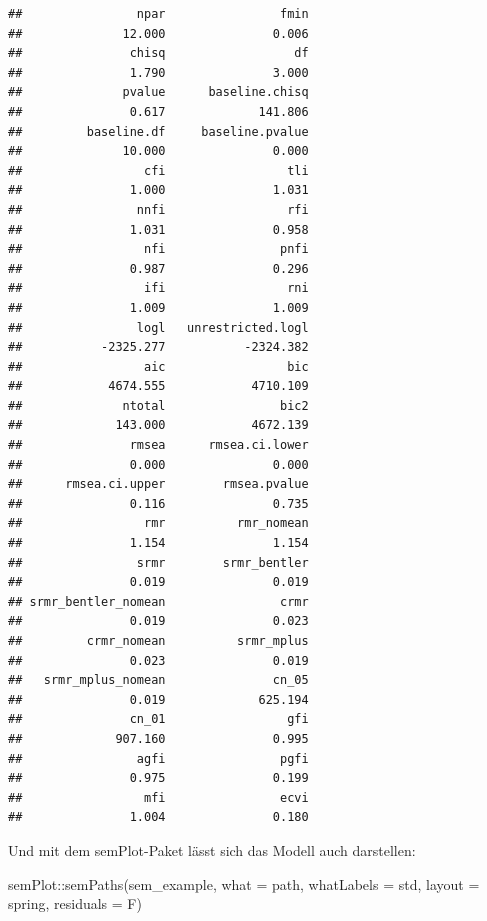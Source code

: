 \documentclass[
]{book}
\newenvironment{Shaded}{\begin{snugshade}}{\end{snugshade}}
\newcommand{\AttributeTok}[1]{\textcolor[rgb]{0.77,0.63,0.00}{#1}}
\newcommand{\FunctionTok}[1]{\textcolor[rgb]{0.00,0.00,0.00}{#1}}
\newcommand{\NormalTok}[1]{#1}
\newcommand{\SpecialCharTok}[1]{\textcolor[rgb]{0.00,0.00,0.00}{#1}}
\newcommand{\StringTok}[1]{\textcolor[rgb]{0.31,0.60,0.02}{#1}}
\begin{document}
\begin{verbatim}
##                npar                fmin 
##              12.000               0.006 
##               chisq                  df 
##               1.790               3.000 
##              pvalue      baseline.chisq 
##               0.617             141.806 
##         baseline.df     baseline.pvalue 
##              10.000               0.000 
##                 cfi                 tli 
##               1.000               1.031 
##                nnfi                 rfi 
##               1.031               0.958 
##                 nfi                pnfi 
##               0.987               0.296 
##                 ifi                 rni 
##               1.009               1.009 
##                logl   unrestricted.logl 
##           -2325.277           -2324.382 
##                 aic                 bic 
##            4674.555            4710.109 
##              ntotal                bic2 
##             143.000            4672.139 
##               rmsea      rmsea.ci.lower 
##               0.000               0.000 
##      rmsea.ci.upper        rmsea.pvalue 
##               0.116               0.735 
##                 rmr          rmr_nomean 
##               1.154               1.154 
##                srmr        srmr_bentler 
##               0.019               0.019 
## srmr_bentler_nomean                crmr 
##               0.019               0.023 
##         crmr_nomean          srmr_mplus 
##               0.023               0.019 
##   srmr_mplus_nomean               cn_05 
##               0.019             625.194 
##               cn_01                 gfi 
##             907.160               0.995 
##                agfi                pgfi 
##               0.975               0.199 
##                 mfi                ecvi 
##               1.004               0.180
\end{verbatim}

Und mit dem semPlot-Paket lässt sich das Modell auch darstellen:

\begin{Shaded}
\begin{Highlighting}[]
\NormalTok{semPlot}\SpecialCharTok{::}\FunctionTok{semPaths}\NormalTok{(sem\_example, }
                  \AttributeTok{what =} \StringTok{\textquotesingle{}path\textquotesingle{}}\NormalTok{, }
                  \AttributeTok{whatLabels =} \StringTok{\textquotesingle{}std\textquotesingle{}}\NormalTok{, }
                  \AttributeTok{layout =} \StringTok{\textquotesingle{}spring\textquotesingle{}}\NormalTok{, }
                  \AttributeTok{residuals =}\NormalTok{ F)}
\end{Highlighting}
\end{Shaded}
\end{document}
